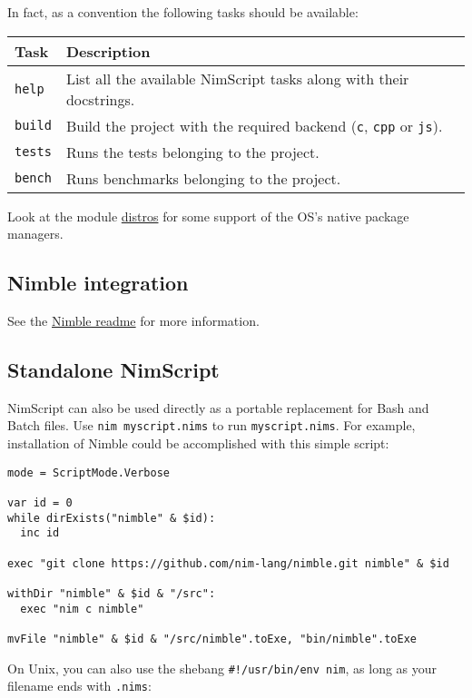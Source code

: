In fact, as a convention the following tasks should be available:

\begin{longtable}[]{@{}ll@{}}
\toprule
Task & Description\tabularnewline
\midrule
\endhead
\texttt{help} & List all the available NimScript tasks along with their
docstrings.\tabularnewline
\texttt{build} & Build the project with the required backend
(\texttt{c}, \texttt{cpp} or \texttt{js}).\tabularnewline
\texttt{tests} & Runs the tests belonging to the project.\tabularnewline
\texttt{bench} & Runs benchmarks belonging to the
project.\tabularnewline
\bottomrule
\end{longtable}

Look at the module \href{distros.html}{distros} for some support of the
OS's native package managers.

\hypertarget{nimble-integration}{%
\subsection{Nimble integration}\label{nimble-integration}}

See the \href{https://github.com/nim-lang/nimble\#readme}{Nimble readme}
for more information.

\hypertarget{standalone-nimscript}{%
\subsection{Standalone NimScript}\label{standalone-nimscript}}

NimScript can also be used directly as a portable replacement for Bash
and Batch files. Use \texttt{nim\ myscript.nims} to run
\texttt{myscript.nims}. For example, installation of Nimble could be
accomplished with this simple script:

\begin{verbatim}
mode = ScriptMode.Verbose

var id = 0
while dirExists("nimble" & $id):
  inc id

exec "git clone https://github.com/nim-lang/nimble.git nimble" & $id

withDir "nimble" & $id & "/src":
  exec "nim c nimble"

mvFile "nimble" & $id & "/src/nimble".toExe, "bin/nimble".toExe
\end{verbatim}

On Unix, you can also use the shebang \texttt{\#!/usr/bin/env\ nim}, as
long as your filename ends with \texttt{.nims}:

